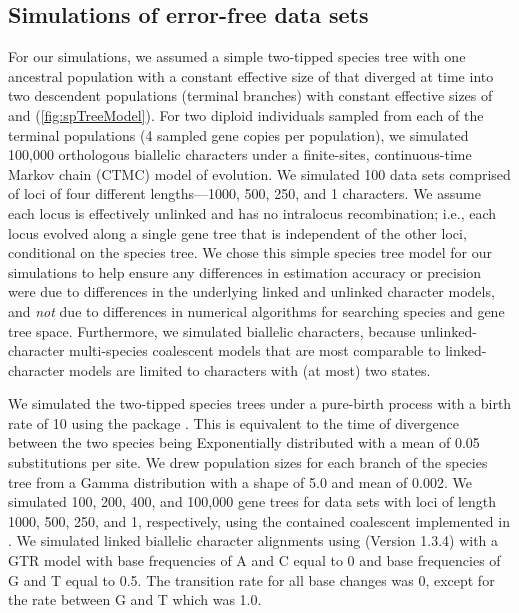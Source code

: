 \subsection{Simulations of error-free data sets}
For our simulations, we assumed a simple two-tipped species tree with one 
ancestral population with a constant effective size of \rootpopsize that 
diverged at time \divtime into two descendent populations (terminal branches) 
with constant effective sizes of \tippopsize[1] and \tippopsize[2] (\cref{fig:spTreeModel}).
For two diploid individuals sampled from each of the terminal
populations (4 sampled gene copies per population),
we simulated 100,000 orthologous biallelic characters under a finite-sites,
continuous-time Markov chain (CTMC) model of evolution.
We simulated 100 data sets comprised of loci of four different lengths---1000,
500, 250, and 1 characters.
We assume each locus is effectively unlinked and has no intralocus
recombination; i.e., each locus evolved along a single gene tree that is
independent of the other loci, conditional on the species tree.
We chose this simple species tree model for our simulations to help ensure any
differences in estimation accuracy or precision were due to differences in the
underlying linked and unlinked character models,
and \emph{not} due to differences in numerical algorithms for searching species
and gene tree space.
Furthermore, we simulated biallelic characters, because unlinked-character
multi-species coalescent models
\citep{bryantInferringSpeciesTrees2012,Oaks2018ecoevolity}
that are most comparable to linked-character models
\citep{Heled2010,ogilvieStarBEAST2BringsFaster2017}
are limited to characters with (at most) two states.

We simulated the two-tipped species trees under a pure-birth process
\citep{Yule1925} with a birth rate of 10 using the \python package \dendropy
\citep[Version 4.40, Commit eb69003;][]{Dendropy}.
This is equivalent to the time of divergence between the two species being
Exponentially distributed with a mean of 0.05 substitutions per site.
We drew population sizes for each branch of the species tree from a Gamma 
distribution with a shape of 5.0 and mean of 0.002.
We simulated 100, 200, 400, and 100,000 gene trees for data sets with loci of
length 1000, 500, 250, and 1, respectively, using the contained coalescent
implemented in \dendropy.
We simulated linked biallelic character alignments using
\seqgen (Version 1.3.4)
\citep{rambautSeqGenApplicationMonte1997}
with a GTR model with base frequencies of A and C equal to 0 and base 
frequencies of G and T equal to 0.5.
The transition rate for all base changes was 0, except for the rate between G
and T which was 1.0. 

